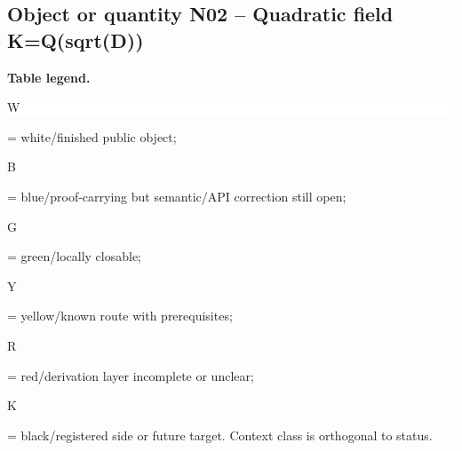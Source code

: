 \subsection*{Object or quantity N02 -- Quadratic field K=Q(sqrt(D))}
\hypertarget{objproof:N02}{}
\par\smallskip\noindent\begin{minipage}{0.99\linewidth}\footnotesize\raggedright\textbf{Table legend.} \colorbox{white}{\strut W} = white/finished public object; \colorbox{cyan!20}{\strut B} = blue/proof-carrying but semantic/API correction still open; \colorbox{green!18}{\strut G} = green/locally closable; \colorbox{yellow!25}{\strut Y} = yellow/known route with prerequisites; \colorbox{red!20}{\strut R} = red/derivation layer incomplete or unclear; \colorbox{black!18}{\strut K} = black/registered side or future target. Context class is orthogonal to status.\end{minipage}\par\vspace{0.25em}
